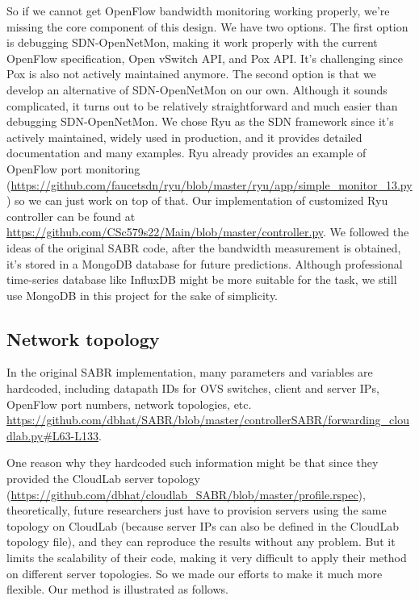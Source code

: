 \documentclass{article}
\begin{document}
So if we cannot get OpenFlow bandwidth monitoring working properly, we're missing the core component of this design. We have two options. The first option is debugging SDN-OpenNetMon, making it work properly with the current OpenFlow specification, Open vSwitch API, and Pox API. It's challenging since Pox is also not actively maintained anymore. The second option is that we develop an alternative of SDN-OpenNetMon on our own. Although it sounds complicated, it turns out to be relatively straightforward and much easier than debugging SDN-OpenNetMon. We chose Ryu \cite{ryu} as the SDN framework since it's actively maintained, widely used in production, and it provides detailed documentation and many examples. Ryu already provides an example of OpenFlow port monitoring (\url{https://github.com/faucetsdn/ryu/blob/master/ryu/app/simple_monitor_13.py}) so we can just work on top of that. Our implementation of customized Ryu controller can be found at \url{https://github.com/CSc579s22/Main/blob/master/controller.py}. We followed the ideas of the original SABR code, after the bandwidth measurement is obtained, it's stored in a MongoDB database for future predictions. Although professional time-series database like InfluxDB might be more suitable for the task, we still use MongoDB in this project for the sake of simplicity.

\subsection{Network topology}
In the original SABR implementation, many parameters and variables are hardcoded, including datapath IDs for OVS switches, client and server IPs, OpenFlow port numbers, network topologies, etc.  \url{https://github.com/dbhat/SABR/blob/master/controllerSABR/forwarding_cloudlab.py#L63-L133}. 

One reason why they hardcoded such information might be that since they provided the CloudLab server topology (\url{https://github.com/dbhat/cloudlab_SABR/blob/master/profile.rspec}), theoretically, future researchers just have to provision servers using the same topology on CloudLab (because server IPs can also be defined in the CloudLab topology file), and they can reproduce the results without any problem. But it limits the scalability of their code, making it very difficult to apply their method on different server topologies. So we made our efforts to make it much more flexible. Our method is illustrated as follows.
\end{document}
